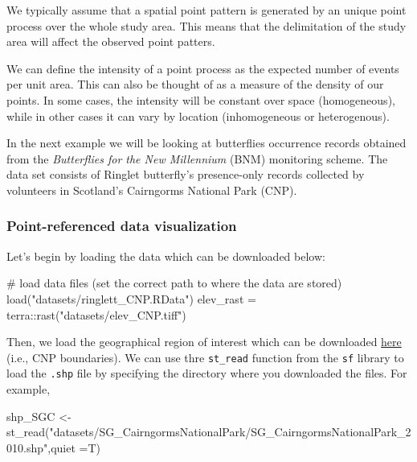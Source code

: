 \documentclass[
  letterpaper,
  DIV=11,
  numbers=noendperiod]{scrartcl}
\newenvironment{Shaded}{\begin{snugshade}}{\end{snugshade}}
\newcommand{\AttributeTok}[1]{\textcolor[rgb]{0.40,0.45,0.13}{#1}}
\newcommand{\CommentTok}[1]{\textcolor[rgb]{0.37,0.37,0.37}{#1}}
\newcommand{\FunctionTok}[1]{\textcolor[rgb]{0.28,0.35,0.67}{#1}}
\newcommand{\NormalTok}[1]{\textcolor[rgb]{0.00,0.23,0.31}{#1}}
\newcommand{\OtherTok}[1]{\textcolor[rgb]{0.00,0.23,0.31}{#1}}
\newcommand{\SpecialCharTok}[1]{\textcolor[rgb]{0.37,0.37,0.37}{#1}}
\newcommand{\StringTok}[1]{\textcolor[rgb]{0.13,0.47,0.30}{#1}}
\begin{document}
We typically assume that a spatial point pattern is generated by an
unique point process over the whole study area. This means that the
delimitation of the study area will affect the observed point patters.

We can define the intensity of a point process as the expected number of
events per unit area. This can also be thought of as a measure of the
density of our points. In some cases, the intensity will be constant
over space (homogeneous), while in other cases it can vary by location
(inhomogeneous or heterogenous).

In the next example we will be looking at butterflies occurrence records
obtained from the \emph{Butterflies for the New Millennium} (BNM)
monitoring scheme. The data set consists of Ringlet butterfly's
presence-only records collected by volunteers in Scotland's Cairngorms
National Park (CNP).

\subsubsection{Point-referenced data
visualization}\label{point-referenced-data-visualization}

Let's begin by loading the data which can be downloaded below:

\begin{Shaded}
\begin{Highlighting}[]
\CommentTok{\# load data files (set the correct path to where the data are stored)}
\FunctionTok{load}\NormalTok{(}\StringTok{"datasets/ringlett\_CNP.RData"}\NormalTok{)}
\NormalTok{elev\_rast }\OtherTok{=}\NormalTok{ terra}\SpecialCharTok{::}\FunctionTok{rast}\NormalTok{(}\StringTok{"datasets/elev\_CNP.tiff"}\NormalTok{)}
\end{Highlighting}
\end{Shaded}

Then, we load the geographical region of interest which can be
downloaded
\href{https://maps.gov.scot/ATOM/shapefiles/SG_CairngormsNationalPark_2010.zip}{here}
(i.e., CNP boundaries). We can use thre \texttt{st\_read} function from
the \texttt{sf} library to load the \texttt{.shp} file by specifying the
directory where you downloaded the files. For example,

\begin{Shaded}
\begin{Highlighting}[]
\NormalTok{shp\_SGC }\OtherTok{\textless{}{-}}  \FunctionTok{st\_read}\NormalTok{(}\StringTok{"datasets/SG\_CairngormsNationalPark/SG\_CairngormsNationalPark\_2010.shp"}\NormalTok{,}\AttributeTok{quiet =}\NormalTok{T)}
\end{Highlighting}
\end{Shaded}
\end{document}
